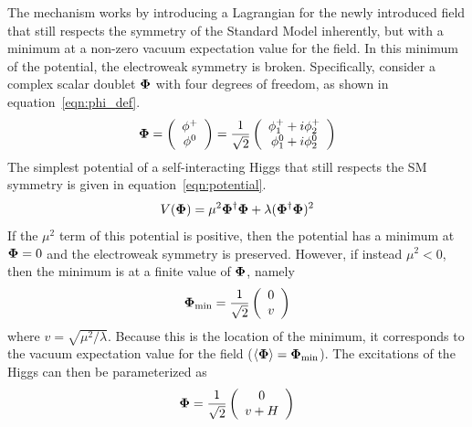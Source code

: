 The mechanism works by introducing a Lagrangian for the newly introduced field that still respects the symmetry of the Standard Model inherently, but with a minimum at a non-zero vacuum expectation value for the field. In this minimum of the potential, the electroweak symmetry is broken. Specifically, consider a complex scalar doublet $\mathbf{\Phi}$ with four degrees of freedom, as shown in equation~\ref{eqn:phi_def}.
%
\begin{equation}
\label{eqn:phi_def}
\mathbf{\Phi} = \left( \begin{array}{c} \phi^+ \\ \phi^0 \end{array} \right) = \frac{1}{\sqrt{2}}\left( \begin{array}{c} \phi_{1}^{+} + i\phi_{2}^+ \\ \phi_1^0 + i\phi_2^0 \end{array} \right)
\end{equation}
%
The simplest potential of a self-interacting Higgs that still respects the SM symmetry is given in equation~\ref{eqn:potential}.
%
\begin{equation}
\label{eqn:potential}
V(\mathbf{\Phi}) = \mu^2 \mathbf{\Phi}^{\dagger}\mathbf{\Phi} + \lambda(\mathbf{\Phi}^\dagger\mathbf{\Phi})^2
\end{equation}
%
If the $\mu^2$ term of this potential is positive, then the potential has a minimum at $\mathbf{\Phi} = 0$ and the electroweak symmetry is preserved. However, if instead $\mu^2 < 0$, then the minimum is at a finite value of $\mathbf{\Phi}$, namely
%
\begin{equation}
\mathbf{\Phi}_{\rm min} = \frac{1}{\sqrt{2}} \left(\begin{array}{c} 0 \\ v\end{array} \right)
\end{equation}
%
where $v = \sqrt{\mu^2/\lambda}$. Because this is the location of the minimum, it corresponds to the vacuum expectation value for the field ($\langle\mathbf{\Phi}\rangle = \mathbf{\Phi}_{\rm min}$). The excitations of the Higgs can then be parameterized as 
%
\begin{equation}
\mathbf{\Phi} = \frac{1}{\sqrt{2}} \left(\begin{array}{c} 0 \\ v + H \end{array}\right)
\end{equation}
